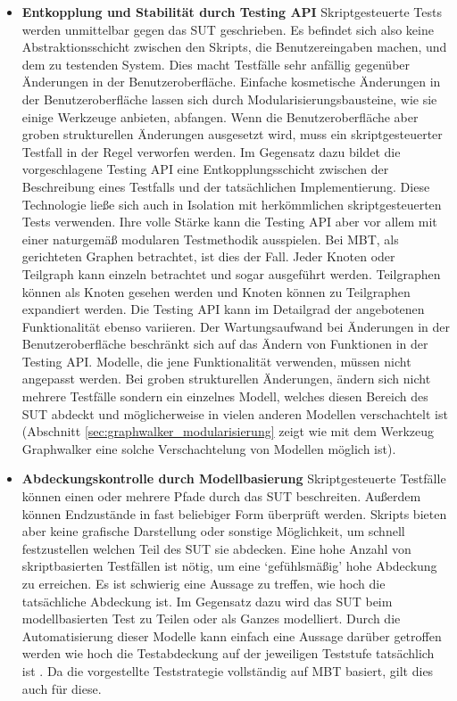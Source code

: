 \begin{itemize}
\item \textbf{Entkopplung und Stabilität durch Testing API}  Skriptgesteuerte Tests werden unmittelbar gegen das \Gls{SUT} geschrieben. Es befindet sich also keine Abstraktionsschicht zwischen den Skripts, die Benutzereingaben machen, und dem zu testenden System. Dies macht Testfälle sehr anfällig gegenüber Änderungen in der Benutzeroberfläche. Einfache kosmetische Änderungen in der Benutzeroberfläche lassen sich durch Modularisierungsbausteine, wie sie einige Werkzeuge anbieten, abfangen. Wenn die Benutzeroberfläche aber groben strukturellen Änderungen ausgesetzt wird, muss ein skriptgesteuerter Testfall in der Regel verworfen werden. Im Gegensatz dazu bildet die vorgeschlagene Testing API eine Entkopplungsschicht zwischen der Beschreibung eines Testfalls und der tatsächlichen Implementierung. Diese Technologie ließe sich auch in Isolation mit herkömmlichen skriptgesteuerten Tests verwenden. Ihre volle Stärke kann die Testing API aber vor allem mit einer naturgemäß modularen Testmethodik ausspielen. Bei \Gls{MBT}, als gerichteten Graphen betrachtet, ist dies der Fall. Jeder Knoten oder Teilgraph kann einzeln betrachtet und sogar ausgeführt werden. Teilgraphen können als Knoten gesehen werden und Knoten können zu Teilgraphen expandiert werden. Die Testing API kann im Detailgrad der angebotenen Funktionalität ebenso variieren. Der Wartungsaufwand bei Änderungen in der Benutzeroberfläche beschränkt sich auf das Ändern von Funktionen in der Testing API. Modelle, die jene Funktionalität verwenden, müssen nicht angepasst werden. Bei groben strukturellen Änderungen, ändern sich nicht mehrere Testfälle sondern ein einzelnes Modell, welches diesen Bereich des \Gls{SUT} abdeckt und möglicherweise in vielen anderen Modellen verschachtelt ist (Abschnitt \ref{sec:graphwalker_modularisierung} zeigt wie mit dem Werkzeug Graphwalker eine solche Verschachtelung von Modellen möglich ist).
\item \textbf{Abdeckungskontrolle durch Modellbasierung} Skriptgesteuerte Testfälle können einen oder mehrere Pfade durch das \Gls{SUT} beschreiten. Außerdem können Endzustände in fast beliebiger Form überprüft werden. Skripts bieten aber keine grafische Darstellung oder sonstige Möglichkeit, um schnell festzustellen welchen Teil des \Gls{SUT} sie abdecken. Eine hohe Anzahl von skriptbasierten Testfällen ist nötig, um eine `gefühlsmäßig' hohe Abdeckung zu erreichen. Es ist schwierig eine Aussage zu treffen, wie hoch die tatsächliche Abdeckung ist. Im Gegensatz dazu wird das \Gls{SUT} beim modellbasierten Test zu Teilen oder als Ganzes modelliert. Durch die Automatisierung dieser Modelle kann einfach eine Aussage darüber getroffen werden wie hoch die Testabdeckung auf der jeweiligen Teststufe tatsächlich ist \cite{utting_practical_2007}. Da die vorgestellte Teststrategie vollständig auf \Gls{MBT} basiert, gilt dies auch für diese. 

\end{itemize}
